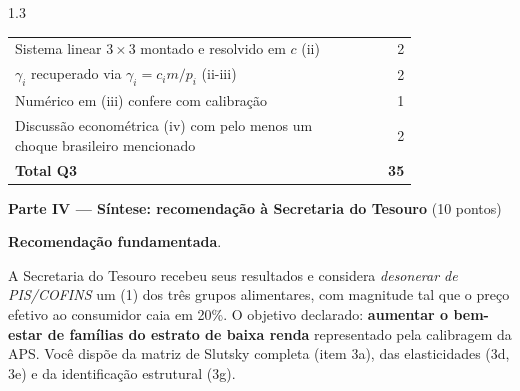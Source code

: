 \documentclass[11pt,addpoints]{exam}
\begin{document}
\begin{spacing}{1.3}
\begin{questions}
{\begin{tabular}{@{}p{0.80\linewidth} r@{}}
\quad Sistema linear $3\times 3$ montado e resolvido em $c$ (ii) & 2 \\
\quad $\gamma_i$ recuperado via $\gamma_i = c_i m/p_i$ (ii-iii) & 2 \\
\quad Numérico em (iii) confere com calibração & 1 \\
\quad Discussão econométrica (iv) com pelo menos um choque brasileiro mencionado & 2 \\
\midrule
\textbf{Total Q3} & \textbf{35} \\
\bottomrule
\end{tabular}\normalsize
}
\fi

\end{questions}

\newpage

\begin{center}\large\textbf{Parte IV --- Síntese: recomendação à Secretaria do Tesouro} \quad (10 pontos)\end{center}

\begin{questions}
\setcounter{question}{3}
\question[10] \textbf{Recomendação fundamentada}.

A Secretaria do Tesouro recebeu seus resultados e considera \emph{desonerar de PIS/COFINS} um (1) dos três grupos alimentares, com magnitude tal que o preço efetivo ao consumidor caia em 20\%. O objetivo declarado: \textbf{aumentar o bem-estar de famílias do estrato de baixa renda} representado pela calibragem da APS. Você dispõe da matriz de Slutsky completa (item 3a), das elasticidades (3d, 3e) e da identificação estrutural (3g).


\end{questions}
\end{spacing}
\end{document}
